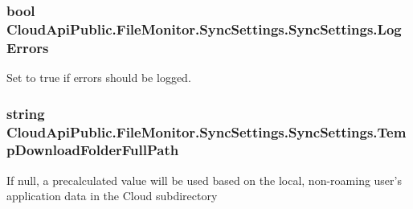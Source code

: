 \hypertarget{class_cloud_api_public_1_1_file_monitor_1_1_sync_settings_1_1_sync_settings_a8df145af03055d26636db13888d986af}{
\subsubsection[{Log\-Errors}]{\setlength{\rightskip}{0pt plus 5cm}bool Cloud\-Api\-Public.\-File\-Monitor.\-Sync\-Settings.\-Sync\-Settings.\-Log\-Errors\hspace{0.3cm}{\ttfamily [get]}}}\label{class_cloud_api_public_1_1_file_monitor_1_1_sync_settings_1_1_sync_settings_a8df145af03055d26636db13888d986af}


Set to true if errors should be logged. 

\hypertarget{class_cloud_api_public_1_1_file_monitor_1_1_sync_settings_1_1_sync_settings_a0234a8261d2a35a6f77de6cbd4e80d85}{
\subsubsection[{Temp\-Download\-Folder\-Full\-Path}]{\setlength{\rightskip}{0pt plus 5cm}string Cloud\-Api\-Public.\-File\-Monitor.\-Sync\-Settings.\-Sync\-Settings.\-Temp\-Download\-Folder\-Full\-Path\hspace{0.3cm}{\ttfamily [get]}}}\label{class_cloud_api_public_1_1_file_monitor_1_1_sync_settings_1_1_sync_settings_a0234a8261d2a35a6f77de6cbd4e80d85}


If null, a precalculated value will be used based on the local, non-\/roaming user's application data in the Cloud subdirectory 

